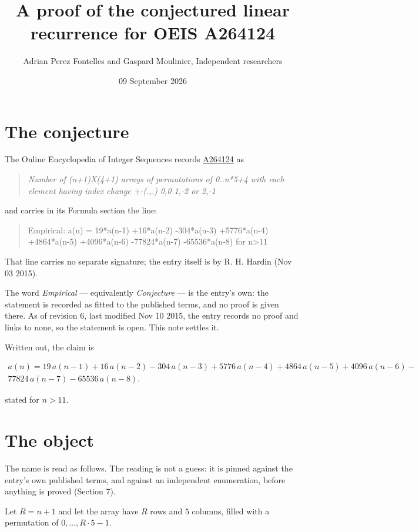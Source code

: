\documentclass[11pt]{article}
\title{A proof of the conjectured linear recurrence for OEIS A264124}
\author{Adrian Perez Fontelles and Gaspard Moulinier, Independent researchers}
\date{09 September 2026}
\theoremstyle{definition}
\begin{document}
\maketitle
\section{The conjecture}

The Online Encyclopedia of Integer Sequences records \href{https://oeis.org/A264124}{A264124} as

\begin{quote}\itshape Number of (n+1)X(4+1) arrays of permutations of 0..n*5+4 with each element having index change +-(.,.) 0,0 1,-2 or 2,-1\end{quote}

and carries in its Formula section the line:

\begin{quote}\ttfamily Empirical: a(n) = 19*a(n-1) +16*a(n-2) -304*a(n-3) +5776*a(n-4) +4864*a(n-5) +4096*a(n-6) -77824*a(n-7) -65536*a(n-8) for n>11\end{quote}

That line carries no separate signature; the entry itself is by R. H. Hardin (Nov 03 2015).

The word {\itshape Empirical} --- equivalently {\itshape Conjecture} --- is the entry's own: the statement is recorded as fitted to the published terms, and no proof is given there. As of revision 6, last modified Nov 10 2015, the entry records no proof and links to none, so the statement is open. This note settles it.

Written out, the claim is

\begin{multline*} a(n) = 19\,a(n-1) + 16\,a(n-2) - 304\,a(n-3) + 5776\,a(n-4) + 4864\,a(n-5) + 4096\,a(n-6) - \\ 77824\,a(n-7) - 65536\,a(n-8). \end{multline*}

stated for $n > 11$.

\section{The object}

The name is read as follows. The reading is not a guess: it is pinned against the entry's own published terms, and against an independent enumeration, before anything is proved (Section 7).

Let $R = n + 1$ and let the array have $R$ rows and $5$ columns, filled with a permutation of $0,\dots,R\cdot5-1$.
\end{document}
